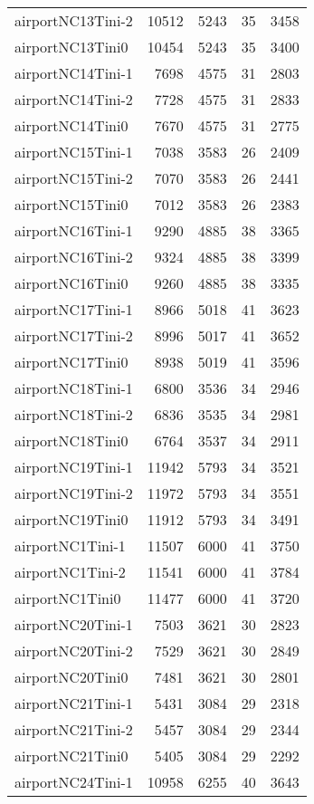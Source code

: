 \begin{longtable}{lrrrr}
airportNC13Tini-2 & 10512 & 5243 & 35 & 3458 \\
airportNC13Tini0 & 10454 & 5243 & 35 & 3400 \\
airportNC14Tini-1 & 7698 & 4575 & 31 & 2803 \\
airportNC14Tini-2 & 7728 & 4575 & 31 & 2833 \\
airportNC14Tini0 & 7670 & 4575 & 31 & 2775 \\
airportNC15Tini-1 & 7038 & 3583 & 26 & 2409 \\
airportNC15Tini-2 & 7070 & 3583 & 26 & 2441 \\
airportNC15Tini0 & 7012 & 3583 & 26 & 2383 \\
airportNC16Tini-1 & 9290 & 4885 & 38 & 3365 \\
airportNC16Tini-2 & 9324 & 4885 & 38 & 3399 \\
airportNC16Tini0 & 9260 & 4885 & 38 & 3335 \\
airportNC17Tini-1 & 8966 & 5018 & 41 & 3623 \\
airportNC17Tini-2 & 8996 & 5017 & 41 & 3652 \\
airportNC17Tini0 & 8938 & 5019 & 41 & 3596 \\
airportNC18Tini-1 & 6800 & 3536 & 34 & 2946 \\
airportNC18Tini-2 & 6836 & 3535 & 34 & 2981 \\
airportNC18Tini0 & 6764 & 3537 & 34 & 2911 \\
airportNC19Tini-1 & 11942 & 5793 & 34 & 3521 \\
airportNC19Tini-2 & 11972 & 5793 & 34 & 3551 \\
airportNC19Tini0 & 11912 & 5793 & 34 & 3491 \\
airportNC1Tini-1 & 11507 & 6000 & 41 & 3750 \\
airportNC1Tini-2 & 11541 & 6000 & 41 & 3784 \\
airportNC1Tini0 & 11477 & 6000 & 41 & 3720 \\
airportNC20Tini-1 & 7503 & 3621 & 30 & 2823 \\
airportNC20Tini-2 & 7529 & 3621 & 30 & 2849 \\
airportNC20Tini0 & 7481 & 3621 & 30 & 2801 \\
airportNC21Tini-1 & 5431 & 3084 & 29 & 2318 \\
airportNC21Tini-2 & 5457 & 3084 & 29 & 2344 \\
airportNC21Tini0 & 5405 & 3084 & 29 & 2292 \\
airportNC24Tini-1 & 10958 & 6255 & 40 & 3643 \\

\end{longtable}

